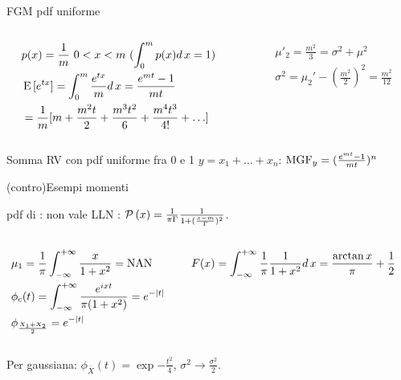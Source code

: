 \begin{wordonframe}{FGM pdf uniforme}
\begin{columns}[T]
\begin{column}{0.5\textwidth}
\begin{align*}
&p(x)=\frac{1}{m}\ 0<x<m\ (\int_0^mp(x)d\,x=1)\\
&\operatorname{E}{[e^{tx}]}=\int_0^m\frac{e^{tx}}{m}d\,x=\frac{e^{mt}-1}{mt}\\
&=\frac{1}{m}[m+\frac{m^2t}{2}+\frac{m^3t^2}{6}+\frac{m^4t^3}{4!}+\ldots]
\end{align*}
\end{column}
\begin{column}{0.5\textwidth}
\begin{align*}
&\mu'_2=\frac{m^2}{3}=\sigma^2+\mu^2\\
&\sigma^2=\mu_2'-(\frac{m^2}{2})^2=\frac{m^2}{12}
\end{align*}
\end{column}
\end{columns}
\begin{block}{Somma RV con pdf uniforme fra 0 e 1}
$y=x_1+\ldots+x_n$: $\operatorname{MGF}_y=(\frac{e^{mt}-1}{mt})^n$
\end{block}
\end{wordonframe}

\begin{wordonframe}{(contro)Esempi momenti}
\begin{block}{pdf di : non vale LLN}
: $\operatorname{\mathcal{P}}{(x)}=\frac{1}{\pi\Gamma}\frac{1}{1+(\frac{x-m}{\Gamma})^2}$.
\begin{columns}[T]
\begin{column}{0.5\textwidth}
\begin{align*}
&\mu_1=\frac{1}{\pi}\int_{-\infty}^{+\infty}{}\frac{x}{1+x^2}=\operatorname{NAN}{}\\
&\phi_c(t)=\int_{-\infty}^{+\infty}{}\frac{e^{ixt}}{\pi(1+x^2)}=e^{-|t|}\\
&\phi_{\frac{X_1+X_2}{2}}=e^{-|t|}
\end{align*}
\end{column}
\begin{column}{0.5\textwidth}
\begin{align*}
&F(x)=\int_{-\infty}^{+\infty}{}\frac{1}{\pi}\frac{1}{1+x^2}d\,x=\frac{\arctan{x}}{\pi}+\frac{1}{2}
\end{align*}
\end{column}
\end{columns}
Per gaussiana: $\phi_{\overline{X}}(t)=\exp{-\frac{t^2}{4}}$, $\sigma^2\to\frac{\sigma^2}{2}$.
\end{block}
\end{wordonframe}

